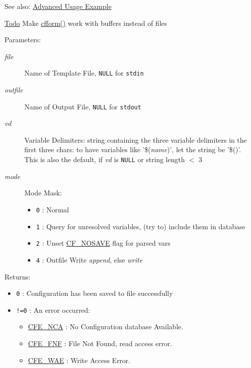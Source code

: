 \begin{Desc}
\item[See also:]\hyperlink{advanced_example}{Advanced Usage Example}\end{Desc}
\begin{Desc}
\item[\hyperlink{todo__todo000003}{Todo}]Make \hyperlink{group__report__generation_g2f8350e7d032c87b2a0e1cb6149a85ec}{cfform()} work with buffers instead of files\end{Desc}
\begin{Desc}
\item[Parameters:]
\begin{description}
\item[{\em file}]Name of Template File, {\tt NULL} for {\tt stdin} \item[{\em outfile}]Name of Output File, {\tt NULL} for {\tt stdout} \item[{\em vd}]Variable Delimiters: string containing the three variable delimiters in the first three chars: to have variables like '\$({\em name\/})', let the string be '\$()'. This is also the default, if {\em vd\/} is {\tt NULL} or string length $<$ 3\item[{\em mode}]Mode Mask: \begin{itemize}
\item {\tt 0} : Normal \item {\tt 1} : Query for unresolved variables, (try to) include them in database \item {\tt 2} : Unset \hyperlink{group__special__options__mask_gd76153c65f68cc0ee5c1a04c8c3e80bf}{CF\_\-NOSAVE} flag for parsed vars \item {\tt 4} : Outfile Write {\em append\/}, else {\em write\/} \end{itemize}
\end{description}
\end{Desc}
\begin{Desc}
\item[Returns:]\begin{itemize}
\item {\tt 0} : Configuration has been saved to file successfully \item {\tt !=0} : An error occurred:\begin{itemize}
\item \hyperlink{group__errors_gf8cd36471ddcc549668f49238855609d}{CFE\_\-NCA} : No Configuration database Available. \item \hyperlink{group__errors_ga3d4c51112fd70d482a4a77c95dc3daf}{CFE\_\-FNF} : File Not Found, read access error. \item \hyperlink{group__errors_gd1375fe531ed1c13233e2fa7ae55534f}{CFE\_\-WAE} : Write Access Error.  \end{itemize}
\end{itemize}
\end{Desc}

